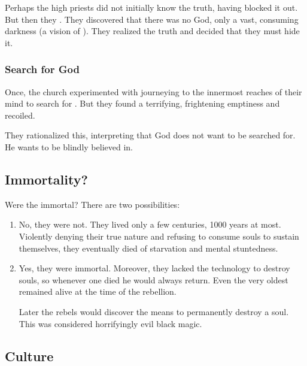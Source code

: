 Perhaps the high priests did not initially know the truth, having blocked it out. 
But then they . 
They discovered that there was no God, only a vast, consuming darkness (a vision of \Erebos). 
They realized the truth and decided that they must hide it. 







\subsubsection{Search for God}
Once, the \Merkyran{} church experimented with journeying to the innermost reaches of their mind to search for . 
But they found a terrifying, frightening emptiness and recoiled. 

They rationalized this, interpreting that God does not want to be searched for. 
He wants to be blindly believed in. 









\subsection{Immortality?}
Were the \Merkyrans{} immortal? 
There are two possibilities: 

\begin{enumerate}
  \item 
    No, they were not. 
    They lived only a few centuries, 1000 years at most. 
    Violently denying their true nature and refusing to consume souls to sustain themselves, they eventually died of starvation and mental stuntedness. 
  \item
    Yes, they were immortal. 
    Moreover, they lacked the technology to destroy souls, so whenever one died he would always return. 
    Even the very oldest \Merkyrans{} remained alive at the time of the rebellion. 
    
    Later the rebels would discover the means to permanently destroy a \resphan{} soul. 
    This was considered horrifyingly evil black magic. 
\end{enumerate}









\subsection{Culture}





